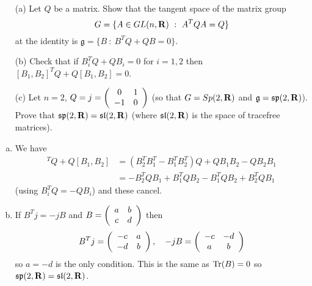 \documentclass[12pt]{article}
\begin{document}
\bigskip



\begin{question}\ \\
\begin{enumerate}
\item[(a)] Let $Q$ be a matrix. Show that the tangent space of the matrix group
\[G=\{A\in GL(n,\mathbf{R})\ :\ A^TQA=Q\}\]
at the identity is $\mathfrak{g}=\{B\ :\ B^TQ+QB=0\}$.
\item[(b)] Check that if $B_i^TQ+QB_i=0$ for $i=1,2$ then $[B_1,B_2]^TQ+Q[B_1,B_2]=0$.
\item[(c)] Let $n=2$, $Q=j=\left(\begin{array}{cc}0 & 1\\ -1 & 0\end{array}\right)$ (so that $G=Sp(2,\mathbf{R})$ and $\mathfrak{g}=\mathfrak{sp}(2,\mathbf{R})$). Prove that $\mathfrak{sp}(2,\mathbf{R})=\mathfrak{sl}(2,\mathbf{R})$ (where $\mathfrak{sl}(2,\mathbf{R})$ is the space of tracefree matrices).
\end{enumerate}
\end{question}

\begin{answer}
\begin{enumerate}[(a)]
If $A(t)$ is a path in $G$ (with $A(0)=1$ and $\dot{A}(0)=B$) then $A(t)^TQA(t)=Q$, so differentiating at $t=0$ gives
\[B^TQ+QB=0.\]
Conversely, if $B$ satisfies $B^TQ+QB=0$ then consider $R(t)=\exp(tB)^TQ\exp(tB)=\exp(tB^T)Q\exp(tB)$. We have $R(0)=Q$ and $\dot{R}(t)=\exp(tB^T)B^TQ\exp(tB)+\exp(tB^T)QB\exp(tB)$. Therefore
\[\dot{R}(t)=\exp(tB^T)(B^TQ+QB)\exp(tB)=0\]
and so $R(t)=R(0)=Q$. Therefore $\exp(tB)$ is a path in $G$ with tangent vector $B$ at the origin. This proves that $\mathfrak{g}=\{B\ :\ B^TQ+QB=0\}$ is the tangent space of $G$ at $1$.
\item We have
\begin{align*}
[B_1,B_2]^TQ+Q[B_1,B_2]&=(B^T_2B^T_1-B^T_1B^T_2)Q+QB_1B_2-QB_2B_1\\
                      &=-B^T_2QB_1+B^T_1QB_2-B^T_1QB_2+B^T_2QB_1
\end{align*}
(using $B_i^TQ=-QB_i$) and these cancel.
\item If $B^Tj=-jB$ and $B=\left(\begin{array}{cc}a & b\\ c & d\end{array}\right)$ then
\[B^Tj=\left(\begin{array}{cc}-c & a\\ -d & b\end{array}\right),\quad -jB=\left(\begin{array}{cc}-c & -d\\ a & b\end{array}\right)\]
so $a=-d$ is the only condition. This is the same as $\operatorname{Tr}(B)=0$ so $\mathfrak{sp}(2,\mathbf{R})=\mathfrak{sl}(2,\mathbf{R})$.
\end{enumerate}
\end{answer}
\newpage

\bigskip
\end{document}

